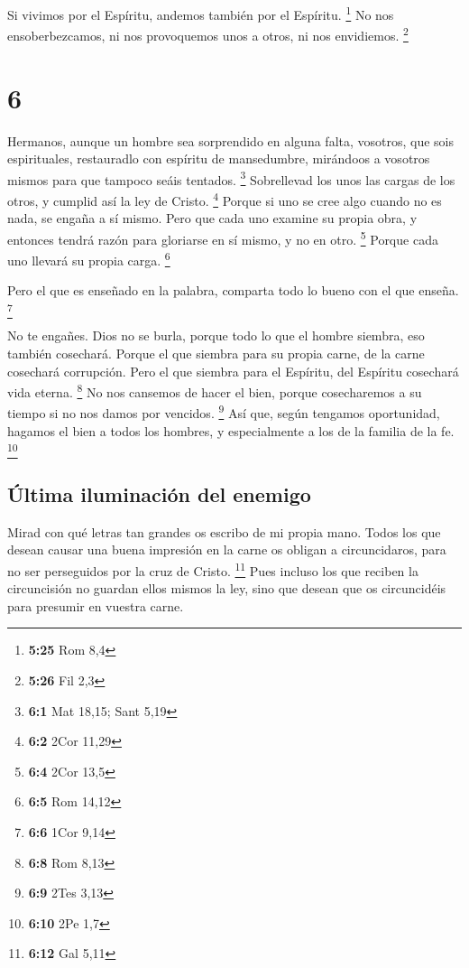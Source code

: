  Si vivimos por el Espíritu, andemos también por el
Espíritu. \footnote{\textbf{5:25} Rom 8,4}  No nos
ensoberbezcamos, ni nos provoquemos unos a otros, ni nos envidiemos.
\footnote{\textbf{5:26} Fil 2,3}

\hypertarget{section-5}{%
\section{6}\label{section-5}}

 Hermanos, aunque un hombre sea sorprendido en alguna
falta, vosotros, que sois espirituales, restauradlo con espíritu de
mansedumbre, mirándoos a vosotros mismos para que tampoco seáis
tentados. \footnote{\textbf{6:1} Mat 18,15; Sant 5,19} 
Sobrellevad los unos las cargas de los otros, y cumplid así la ley de
Cristo. \footnote{\textbf{6:2} 2Cor 11,29}  Porque si uno
se cree algo cuando no es nada, se engaña a sí mismo. 
Pero que cada uno examine su propia obra, y entonces tendrá razón para
gloriarse en sí mismo, y no en otro. \footnote{\textbf{6:4} 2Cor 13,5}
 Porque cada uno llevará su propia carga. \footnote{\textbf{6:5}
  Rom 14,12}

 Pero el que es enseñado en la palabra, comparta todo lo
bueno con el que enseña. \footnote{\textbf{6:6} 1Cor 9,14}

 No te engañes. Dios no se burla, porque todo lo que el
hombre siembra, eso también cosechará.  Porque el que
siembra para su propia carne, de la carne cosechará corrupción. Pero el
que siembra para el Espíritu, del Espíritu cosechará vida eterna.
\footnote{\textbf{6:8} Rom 8,13}  No nos cansemos de hacer
el bien, porque cosecharemos a su tiempo si no nos damos por vencidos.
\footnote{\textbf{6:9} 2Tes 3,13}  Así que, según
tengamos oportunidad, hagamos el bien a todos los hombres, y
especialmente a los de la familia de la fe. \footnote{\textbf{6:10} 2Pe
  1,7}

\hypertarget{uxfaltima-iluminaciuxf3n-del-enemigo}{%
\subsection{Última iluminación del
enemigo}\label{uxfaltima-iluminaciuxf3n-del-enemigo}}

 Mirad con qué letras tan grandes os escribo de mi propia
mano.  Todos los que desean causar una buena impresión en
la carne os obligan a circuncidaros, para no ser perseguidos por la cruz
de Cristo. \footnote{\textbf{6:12} Gal 5,11}  Pues
incluso los que reciben la circuncisión no guardan ellos mismos la ley,
sino que desean que os circuncidéis para presumir en vuestra carne.

